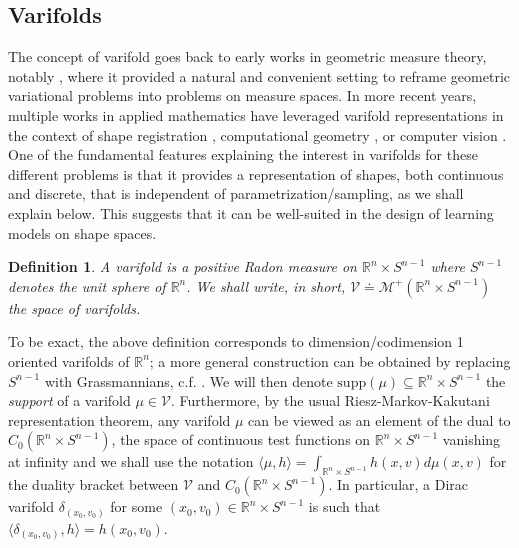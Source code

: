 \documentclass[11pt]{article}
\newtheorem{definition}{Definition}
\newcommand{\R}{\mathbb{R}}
\begin{document}
\subsection{Varifolds} 
\label{ssec:varifolds}
The concept of varifold goes back to early works in geometric measure theory, notably \cite{Almgren66,Allard72}, where it provided a natural and convenient setting to reframe geometric variational problems into problems on measure spaces. In more recent years, multiple works in applied mathematics have leveraged varifold representations in the context of shape registration \cite{charon2013varifold,kaltenmark2017general,lee2024neural,stouffer2024cross}, computational geometry \cite{hsieh2021metrics,buet2022weak,paul2024sparse}, or computer vision \cite{pierson20223d,besnier2023toward,hartman2025basis}. One of the fundamental features explaining the interest in varifolds for these different problems is that it provides a representation of shapes, both continuous and discrete, that is independent of parametrization/sampling, as we shall explain below. This suggests that it can be well-suited in the design of learning models on shape spaces. 

\begin{definition}
    A varifold is a positive Radon measure on $\R^n \times S^{n-1}$ where $S^{n-1}$ denotes the unit sphere of $\R^n$. We shall write, in short, $\mathcal{V} \doteq \mathcal{M}^+(\R^n \times S^{n-1})$ the space of varifolds. 
\end{definition}
To be exact, the above definition corresponds to dimension/codimension 1 oriented varifolds of $\R^n$; a more general construction can be obtained by replacing $S^{n-1}$ with Grassmannians, c.f. \cite{Allard72,charon2013varifold}. We will then denote $\text{supp}(\mu) \subseteq \R^n \times S^{n-1}$ the \textit{support} of a varifold $\mu \in \mathcal{V}$. Furthermore, by the usual Riesz-Markov-Kakutani representation theorem, any varifold $\mu$ can be viewed as an element of the dual to $C_0(\R^n \times S^{n-1})$, the space of continuous test functions on $\R^n \times S^{n-1}$ vanishing at infinity and we shall use the notation $\langle \mu , h\rangle = \int_{\R^n \times S^{n-1}} h(x,v) d\mu(x,v)$ for the duality bracket between $\mathcal{V}$ and $C_0(\R^n \times S^{n-1})$. In particular, a Dirac varifold $\delta_{(x_0,v_0)}$ for some $(x_0,v_0) \in \R^n \times S^{n-1}$ is such that $\langle \delta_{(x_0,v_0)} , h\rangle =h(x_0,v_0)$.  
\end{document}
